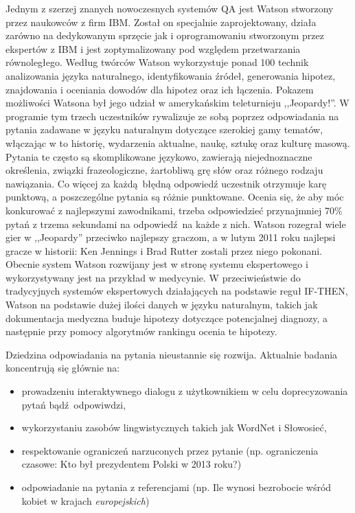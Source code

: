 \documentclass[a4paper, twoside, 12pt]{report}
\begin{document}
            Jednym z szerzej znanych nowoczesnych systemów QA jest Watson stworzony przez naukowców z firm IBM.
            Został on specjalnie zaprojektowany, działa zarówno na dedykowanym sprzęcie jak i oprogramowaniu stworzonym
            przez ekspertów z IBM i jest zoptymalizowany pod względem przetwarzania równoległego.
            Według twórców Watson wykorzystuje ponad 100 technik analizowania języka naturalnego, identyfikowania źródeł,
            generowania hipotez, znajdowania i oceniania dowodów dla hipotez oraz ich łączenia\cite{WATSON}.
            Pokazem możliwości Watsona był jego udział w amerykańskim teleturnieju ,,Jeopardy!''. W programie tym
            trzech uczestników rywalizuje ze sobą poprzez odpowiadania na pytania zadawane w języku naturalnym dotyczące
            szerokiej gamy tematów, włączając w to historię, wydarzenia aktualne, naukę, sztukę oraz kulturę masową.
            Pytania te często są skomplikowane językowo, zawierają niejednoznaczne określenia, związki frazeologiczne,
            żartobliwą grę słów oraz różnego rodzaju nawiązania.
            Co więcej za każdą błędną odpowiedź uczestnik otrzymuje karę punktową, a poszczególne pytania są różnie
            punktowane. Ocenia się, że aby móc konkurować z najlepszymi zawodnikami, trzeba odpowiedzieć przynajmniej
            70\% pytań z trzema sekundami na odpowiedź na każde z nich. Watson rozegrał wiele gier w ,,Jeopardy'' przeciwko
            najlepszy graczom, a w lutym 2011 roku najlepsi gracze w historii: Ken Jennings i Brad Rutter zostali przez
            niego pokonani. Obecnie system Watson rozwijany jest w stronę systemu ekspertowego i wykorzystywany jest na
            przykład w medycynie. W przeciwieństwie do tradycyjnych systemów ekspertowych działających na podstawie
            reguł IF-THEN, Watson na podstawie dużej ilości danych w języku naturalnym, takich jak  dokumentacja medyczna
            buduje hipotezy dotyczące potencjalnej diagnozy, a następnie przy pomocy algorytmów rankingu ocenia te
            hipotezy\cite{WATSONMEDICINE}.

            Dziedzina odpowiadania na pytania nieustannie się rozwija. Aktualnie badania koncentrują się głównie na:
            \begin{itemize}
                \item prowadzeniu interaktywnego dialogu z użytkownikiem w celu doprecyzowania pytań bądź odpowiwdzi,
                \item wykorzystaniu zasobów lingwistycznych takich jak WordNet i Słowosieć,
                \item respektowanie ograniczeń narzuconych przez pytanie (np. ograniczenia czasowe: Kto był prezydentem
                    Polski w 2013 roku?)
                \item odpowiadanie na pytania z referencjami (np. Ile wynosi bezrobocie wśród kobiet w krajach \emph{europejskich})
            \end{itemize}
\end{document}
